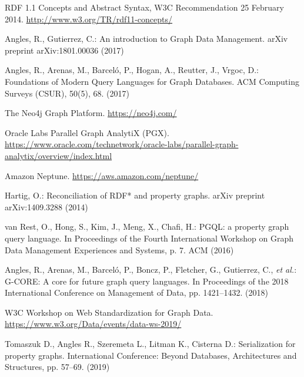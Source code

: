 \documentclass[runningheads]{llncs}
\begin{document}
%
%
%

% 
%
\begin{thebibliography}{8}

RDF 1.1 Concepts and Abstract Syntax, W3C Recommendation 25 February 2014. \url{http://www.w3.org/TR/rdf11-concepts/}


Angles, R., Gutierrez, C.: An introduction to Graph Data Management. arXiv preprint arXiv:1801.00036 (2017)

Angles, R., Arenas, M., Barceló, P., Hogan, A., Reutter, J., Vrgoc, D.: Foundations of Modern Query Languages for Graph Databases. ACM Computing Surveys (CSUR), 50(5), 68. (2017)

The Neo4j Graph Platform. \url{https://neo4j.com/}

Oracle Labs Parallel Graph AnalytiX (PGX). \url{https://www.oracle.com/technetwork/oracle-labs/parallel-graph-analytix/overview/index.html}

Amazon Neptune. \url{https://aws.amazon.com/neptune/}
 
Hartig, O.: Reconciliation of RDF* and property graphs. arXiv preprint arXiv:1409.3288 (2014)

van Rest, O., Hong, S., Kim, J., Meng, X., Chafi, H.: PGQL: a property graph query language. In Proceedings of the Fourth International Workshop on Graph Data Management Experiences and Systems, p. 7. ACM (2016)

Angles, R., Arenas, M., Barceló, P., Boncz, P., Fletcher, G., Gutierrez, C., {\itshape et al.}: G-CORE: A core for future graph query languages. In Proceedings of the 2018 International Conference on Management of Data, pp. 1421--1432. (2018)

W3C Workshop on Web Standardization for Graph Data. \url{https://www.w3.org/Data/events/data-ws-2019/}

Tomaszuk D., Angles R., Szeremeta L., Litman K., Cisterna D.:
Serialization for property graphs. International Conference: Beyond Databases, Architectures and Structures, pp. 57--69. (2019)


\end{thebibliography}
\end{document}
